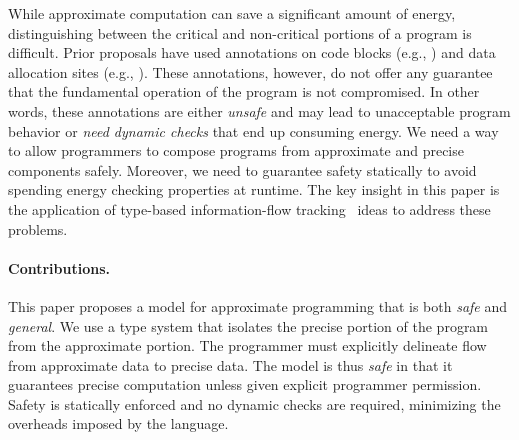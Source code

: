 While approximate computation can save a significant amount of
energy, distinguishing
between the critical and non-critical portions of a program is
difficult. Prior
proposals have used annotations on code blocks (e.g., \cite{relax}) and
data allocation sites (e.g., \cite{flikker}). These annotations,
however, do not offer any guarantee that the fundamental operation of the
program is not compromised. In other words, these annotations are either
{\em unsafe} and may lead to unacceptable program behavior or {\em
  need dynamic checks} that end up consuming energy. We need a
way to allow programmers to compose programs from approximate
and precise components safely. Moreover, we need to guarantee safety statically
to avoid spending energy
checking properties at runtime. The key insight in this paper is
the application of type-based information-flow tracking~\cite{infflow-survey}
ideas to address these problems.


\paragraph{Contributions.}
This paper proposes a model for approximate programming that is
both \emph{safe} and \emph{general}. We use a type system that
isolates the precise portion of the program from the
approximate portion. The programmer must explicitly delineate flow
from approximate data to precise data. The model is thus \emph{safe}
in that it guarantees precise computation unless given explicit
programmer permission.  Safety is
statically enforced and no dynamic checks are
required, minimizing the overheads imposed by
the language.


